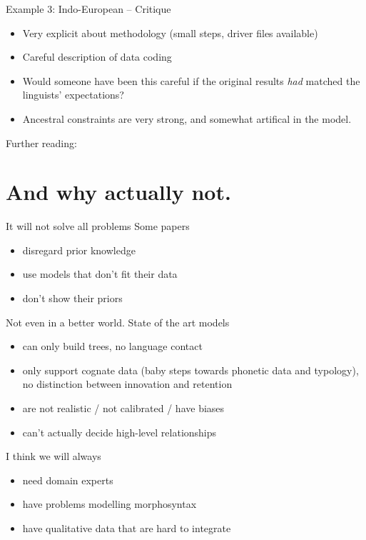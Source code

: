 \documentclass[9pt]{beamer}
\begin{document}
\begin{frame}{Example 3: Indo-European – Critique}
  \begin{itemize}
  \item Very explicit about methodology (small steps, driver files available)
  \item Careful description of data coding
  \item Would someone have been this careful if the original results \emph{had}
    matched the linguists' expectations?
  \item Ancestral constraints are very strong, and somewhat artifical in the
    model.
  \end{itemize}
  Further reading: \textcite{verkerk2017phylogenies}
\end{frame}
\section{And why actually not.}
\begin{frame}{It will not solve all problems}
  Some papers
  \begin{itemize}
  \item disregard prior knowledge
  \item use models that don't fit their data
  \item don't show their priors
  \end{itemize}
\end{frame}
\begin{frame}{Not even in a better world.}
  State of the art models
  \begin{itemize}
  \item can only build trees, no language contact
    \pause
  \item only support cognate data (baby steps towards phonetic data and typology),
    \pause no distinction between innovation and retention
    \pause
  \item are not realistic / not calibrated / have biases
    \pause
  \item can't actually decide high-level relationships
  \end{itemize}
  \pause
  I think we will always
  \begin{itemize}
  \item need domain experts
  \item have problems modelling morphosyntax
  \item have qualitative data that are hard to integrate
  \end{itemize}
\end{frame}
\end{document}
